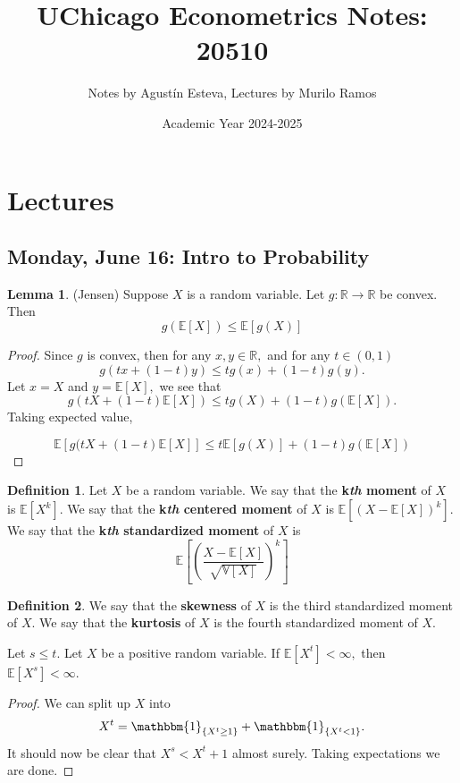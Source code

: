\documentclass[10pt, oneside]{article}
\title{UChicago Econometrics Notes: 20510}
\author{Notes by Agustín Esteva, Lectures by Murilo Ramos}
\date{Academic Year 2024-2025}
\newcommand{\bbR}{\mathbb{R}}
\newcommand{\bbE}{\mathbb{E}}
\newcommand{\bbV}{\mathbb{V}}
\theoremstyle{definition}
\newtheorem{defn}{Definition}
\newtheorem{lem}{Lemma}
\begin{document}
\maketitle
\tableofcontents

\vspace{.25in}


\newpage
\section{Lectures}

\subsection{Monday, June 16: Intro to Probability}
\begin{lem}
    (Jensen) Suppose $X$ is a random variable. Let $g: \bbR \to \bbR$ be convex. Then
    \[g(\bbE[X]) \leq \bbE[g(X)]\]
\end{lem}
\begin{proof}
    Since $g$ is convex, then for any $x,y \in \bbR,$ and for any $t\in (0,1)$
    \[g(tx + (1-t)y) \leq tg(x) + (1-t)g(y).\] Let $x = X$ and $y = \bbE[X],$ we see that 
    \[g(tX + (1-t)\bbE[X]) \leq tg(X) + (1-t)g(\bbE[X]).\] Taking expected value,

    \[\bbE[g(tX + (1 - t)\bbE[X]] \leq t\bbE[g(X)] + (1-t)g(\bbE[X])\]
\end{proof}

\begin{defn}
    Let $X$ be a random variable. We say that the \textbf{k\textit{th} moment} of $X$ is $\bbE[X^k].$ We say that the \textbf{k\textit{th} centered moment} of $X$ is $\bbE[(X - \bbE[X])^k].$ We say that the \textbf{k\textit{th} standardized moment} of $X$ is 
    \[\bbE\left[\left(\frac{X - \bbE[X]}{\sqrt{\bbV[X]}}\right)^k\right]\]
\end{defn}

\begin{defn}
    We say that the \textbf{skewness} of $X$ is the third standardized moment of $X.$ We say that the \textbf{kurtosis} of $X$ is the fourth standardized moment of $X.$
\end{defn}

\begin{lemma}
    Let $s \leq t.$ Let $X$ be a positive random variable. If $\bbE[X^t] < \infty,$ then $\bbE[X^s] < \infty.$
\end{lemma}
\begin{proof}
    We can split up $X$ into 
    \[X^t = \mathbbm{1}_{\{X^t \geq 1\}} + \mathbbm{1}_{\{X^t <1\}}.\] It should now be clear that $X^s < X^t + 1$ almost surely. Taking expectations we are done.
\end{proof}
\end{document}
